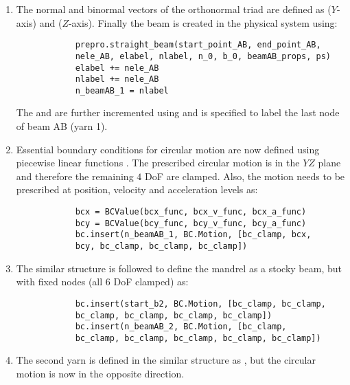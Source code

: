 \begin{enumerate}
    \item The normal and binormal vectors of the orthonormal triad are defined as  ($Y$-axis) and  ($Z$-axis). Finally the beam is created in the physical system using:
        \pythonstyle
        \begin{tcolorbox}\begin{lstlisting}
            prepro.straight_beam(start_point_AB, end_point_AB, 
            nele_AB, elabel, nlabel, n_0, b_0, beamAB_props, ps)
            elabel += nele_AB 
            nlabel += nele_AB 
            n_beamAB_1 = nlabel
        \end{lstlisting}\end{tcolorbox}
        The  and  are further incremented using  and  is specified to label the last node of beam AB (yarn 1).
    \item Essential boundary conditions for circular motion are now defined using piecewise linear functions . The prescribed circular motion is in the $YZ$ plane and therefore the remaining $4$ DoF are clamped. Also, the motion needs to be prescribed at position, velocity and acceleration levels as:
        \pythonstyle
        \begin{tcolorbox}\begin{lstlisting}
            bcx = BCValue(bcx_func, bcx_v_func, bcx_a_func)
            bcy = BCValue(bcy_func, bcy_v_func, bcy_a_func)
            bc.insert(n_beamAB_1, BC.Motion, [bc_clamp, bcx, 
            bcy, bc_clamp, bc_clamp, bc_clamp])
        \end{lstlisting}\end{tcolorbox}
    \item The similar structure is followed to define the mandrel as a stocky beam, but with fixed nodes (all $6$ DoF clamped) as:
        \pythonstyle
        \begin{tcolorbox}\begin{lstlisting}
            bc.insert(start_b2, BC.Motion, [bc_clamp, bc_clamp, 
            bc_clamp, bc_clamp, bc_clamp, bc_clamp])
            bc.insert(n_beamAB_2, BC.Motion, [bc_clamp, 
            bc_clamp, bc_clamp, bc_clamp, bc_clamp, bc_clamp])
        \end{lstlisting}\end{tcolorbox}
    \item The second yarn is defined in the similar structure as , but the circular motion is now in the opposite direction.

\end{enumerate}
